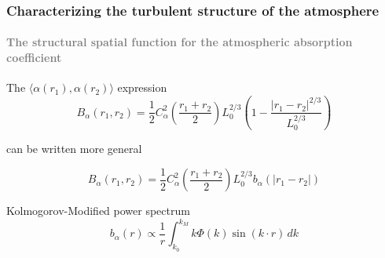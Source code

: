 \documentclass[aspectratio=169]{beamer}
\begin{document}
\begin{frame}
    \frametitle{Characterizing the turbulent structure of the atmosphere}
    \framesubtitle{\textcolor{gray}{The structural spatial function for the atmospheric absorption coefficient}}
    The $\langle\alpha(r_1),\alpha(r_2)\rangle$ expression
    \begin{equation}
        B_\alpha(r_1, r_2) = \frac{1}{2} C_\alpha^2 \left(\frac{r_1+r_2}{2}\right) L_0^{2/3}\left(1-\frac{\lvert r_1 - r_2 \rvert^{2/3}}{L_0^{2/3}}\right)\nonumber
    \end{equation}

    can be written more general

    \begin{equation}
        B_\alpha(r_1, r_2) = \frac{1}{2} C_\alpha^2\left(\frac{r_1+r_2}{2}\right)L_0^{2/3} b_\alpha(\lvert r_1 - r_2 \rvert)
    \end{equation}

    \begin{block}{Kolmogorov-Modified power spectrum}
        \begin{equation}
            b_\alpha(r) \propto \frac{1}{r}\int_{k_0}^{k_M} k \Phi(k) \sin(k\cdot r)\,dk
        \end{equation}
    \end{block}
\end{frame}
\end{document}
